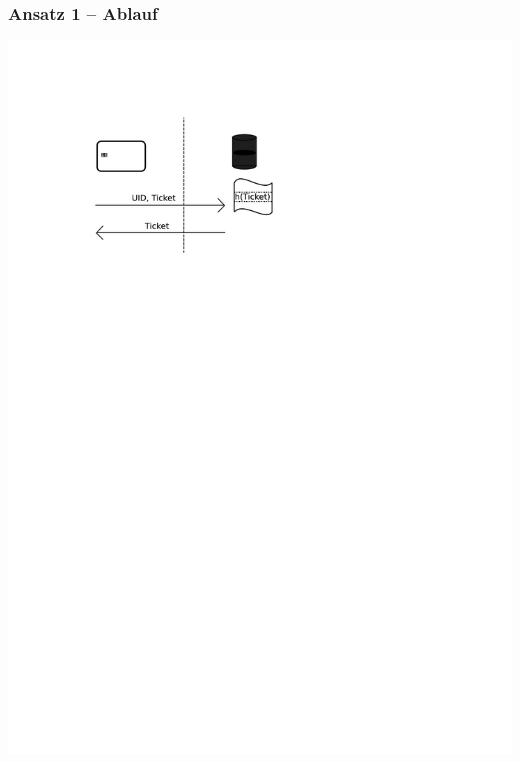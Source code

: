 \begin{frame}
	\frametitle{Ansatz 1 -- Ablauf}
\includegraphics[scale=0.75]{ansatz1ablauf.pdf}
\end{frame}

